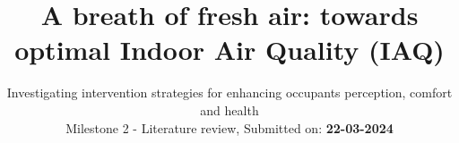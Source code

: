 \title{A breath of fresh air: towards optimal Indoor Air Quality (IAQ)}
\subtitle{Investigating intervention strategies for enhancing occupants perception, comfort and health\\ Milestone 2 - Literature review, Submitted on: \textbf{22-03-2024}}